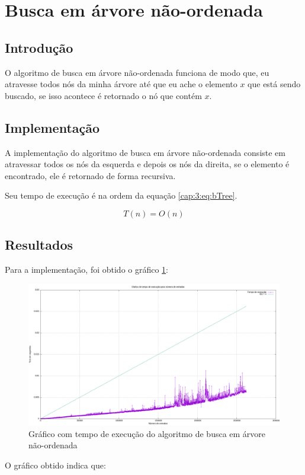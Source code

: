 \section{Busca em árvore não-ordenada} \label{cap:3:section:btree}

\subsection{Introdução}

O algoritmo de busca em árvore não-ordenada funciona de modo que, eu atravesse todos
nós da minha árvore até que eu ache o elemento $x$ que está sendo buscado, se isso acontece
é retornado o nó que contém $x$.

\subsection{Implementação}

A implementação do algoritmo de busca em árvore não-ordenada consiste em atravessar todos os
nós da esquerda e depois os nós da direita, se o elemento é encontrado, ele é retornado de forma
recursiva.



Seu tempo de execução é na ordem da equação \ref{cap:3:eq:bTree}.

\begin{equation} \label{cap:3:eq:bTree}
    T(n) = O(n)
\end{equation}

\subsection{Resultados}

Para a implementação, foi obtido o gráfico \ref{cap:3:graph:bTree}:

\begin{figure}[h]
    \centering
    \includegraphics[width=\textwidth]{image/graphics/btree.png}
    \caption{Gráfico com tempo de execução do algoritmo de busca em árvore não-ordenada}
    \label{cap:3:graph:bTree}
\end{figure}

O gráfico obtido indica que:
